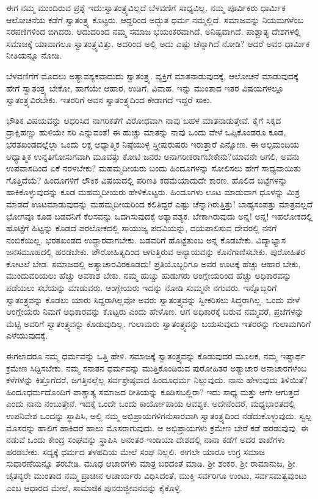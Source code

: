 ಈಗ ನಮ್ಮ ಮುಂದಿರುವ ಪ್ರಶ್ನೆ ಇದು:ಸ್ವಾತಂತ್ರ್ಯವಿಲ್ಲದೆ ಬೆಳವಣಿಗೆ ಸಾಧ್ಯವಿಲ್ಲ. ನಮ್ಮ ಪೂರ್ವಿಕರು ಧಾರ್ಮಿಕ ಆಲೋಚನೆಯ ಕಡೆಗೆ ಸ್ವಾತಂತ್ರ್ಯ ಕೊಟ್ಟರು. ಆದ್ದರಿಂದ ಅದ್ಭುತ ಧರ್ಮ ನಮ್ಮಲ್ಲಿದೆ. ಸಮಾಜವನ್ನು ನಿಯಮಗಳೆಂಬ ಸರಪಣಿಗಳಿಂದ ಬಿಗಿದರು. ಆದುದರಿಂದ ನಮ್ಮ ಸಮಾಜ ಭಯಂಕರವಾಗಿದೆ, ಅನಿಷ್ಟವಾಗಿದೆ. ಪಾಶ್ಚಾತ್ಯ ದೇಶಗಳಲ್ಲಿ ಸಮಾಜಕ್ಕೆ ಯಾವಾಗಲೂ ಸ್ವಾತಂತ್ರ್ಯವಿತ್ತು. ಅದರಿಂದ ಅಲ್ಲಿ ಅದು ಎಷ್ಟು ಚೆನ್ನಾಗಿದೆ ನೋಡಿ? ಆದರೆ ಅವರ ಧಾರ್ಮಿಕ ನೀತಿಯನ್ನೂ ನೋಡಿ.

ಬೆಳವಣಿಗೆಗೆ ಮೊದಲು ಅತ್ಯಾವಶ್ಯಕವಾದುದು ಸ್ವಾತಂತ್ರ್ಯ. ವ್ಯಕ್ತಿಗೆ ಮಾತನಾಡುವುದಕ್ಕೆ, ಆಲೋಚನೆ ಮಾಡುವುದಕ್ಕೆ ಹೇಗೆ ಸ್ವಾತಂತ್ರ್ಯ ಬೇಕೋ, ಹಾಗೆಯೇ ಆಹಾರ, ಉಡಿಗೆ, ವಿವಾಹ, ಇನ್ನು ಮುಂತಾದ ಇತರ ವಿಷಯಗಳಲ್ಲೂ ಸ್ವಾತಂತ್ರ್ಯವಿರಬೇಕು. ಇತರರಿಗೆ ಅವನ ಸ್ವಾತಂತ್ರ್ಯದಿಂದ ಕೇಡಾಗದೆ ಇದ್ದರೆ ಸಾಕು.

ಭೌತಿಕ ವಿಷಯವನ್ನು ಆಧರಿಸಿದ ನಾಗರಿಕತೆಗೆ ವಿರೋಧವಾಗಿ ನಾವು ಬಹಳ ಮಾತನಾಡುತ್ತೇವೆ. ಕೈಗೆ ಸಿಕ್ಕದ ದ್ರಾಕ್ಷಿಹಣ್ಣು ಹುಳಿಯೇ ಸರಿ ಎನ್ನುವಂತೆ! ಈ ಹುಚ್ಚು ಮಾತನ್ನು ನಾವು ಒಂದು ವೇಳೆ ಒಪ್ಪಿಕೊಂಡರೂ ಕೂಡ, ಭರತಖಂಡದಲ್ಲೆಲ್ಲಾ ಒಂದು ಲಕ್ಷ ಆಧ್ಯಾತ್ಮಿಕ ನಿಷ್ಠೆಯುಳ್ಳ ಸ್ತ್ರೀ\enginline{-}ಪುರುಷರು ಇರುತ್ತಾರೆ ಎನ್ನೋಣ. ಈ ಅಲ್ಪಮಂದಿಯ ಆಧ್ಯಾತ್ಮಿಕ ಉನ್ನತಿಗೋಸುಗವಾಗಿ ಮೂವತ್ತು ಕೋಟಿ ಜನರು ಅನಾಗರೀಕರಾಗಬೇಕೇನು?ಯಾವನೇ ಆಗಲಿ, ಅವನು ಉಪವಾಸದಿಂದ ಏಕೆ ನರಳಬೇಕು? ಮಹಮ್ಮದೀಯರು ಬಂದು ಹಿಂದೂಗಳನ್ನು ಸೋಲಿಸಲು ಹೇಗೆ ಸಾಧ್ಯವಾಯಿತು ಗೊತ್ತಿದೆಯೆ? ಹಿಂದೂಗಳಿಗೆ ಲೌಕಿಕ ವಿಷಯದಲ್ಲಿ ಪರಿಣತಿ ಕಡಮೆಯಾದುದೇ ಕಾರಣ. ಹೊಲಿದ ಬಟ್ಟೆಗಳನ್ನು ಹಾಕಿಕೊಳ್ಳುವುದನ್ನು ಕೂಡ ಮಹಮ್ಮದೀಯರು ಹೇಳಿಕೊಟ್ಟರು. ಹಿಂದೂಗಳು ಊಟ ಮಾಡುವಾಗ ಧೂಳನ್ನು ಮಿಶ್ರ ಮಾಡದೆ ಊಟಮಾಡುವುದನ್ನು ಮಹಮ್ಮದೀಯರಿಂದ ಕಲಿತಿದ್ದರೆ ಎಷ್ಟು ಚೆನ್ನಾಗಿರುತ್ತಿತ್ತು! ಬಾಹ್ಯಸಂಪತ್ತು ಮಾತ್ರವಲ್ಲದೆ ಭೋಗವೂ ಕೂಡ ಬಡವನಿಗೆ ಕೆಲಸವನ್ನು ಒದಗಿಸುವುದಕ್ಕೆ ಅತ್ಯಾವಶ್ಯಕ. ಬೇಕಾಗಿರುವುದು ಅನ್ನ! ಅನ್ನ! ಇಹಲೋಕದಲ್ಲಿ ಹೊಟ್ಟೆಗೆ ಹಿಟ್ಟನ್ನು ಕೊಡದೆ ಪರಲೋಕದಲ್ಲಿ ಸಾಯುಜ್ಯ ಪದವಿಯನ್ನು, ದಯಪಾಲಿಸುವ ದೇವರಲ್ಲಿ ನನಗೆ ನಂಬಿಕೆಯಿಲ್ಲ. ಭರತಖಂಡದ ಉದ್ದಾರವಾಗಬೇಕು. ಬಡವರಿಗೆ ಹೊಟ್ಟೆತುಂಬ ಅನ್ನ ಕೊಡಬೇಕು. ವಿದ್ಯಾಭ್ಯಾಸ ಜನಸಮೂಹದಲ್ಲಿ ಹರಡಬೇಕು. ಪೌರೋಹಿತ್ಯದಿಂದ ಆಗುತ್ತಿರುವ ಅನ್ಯಾಯವನ್ನು ಕೊನೆಗಾಣಿಸಬೇಕು. ಪುರೋಹಿತರ ಕೋಟಲೆ ಬೇಡ. ಸಮಾಜದಲ್ಲಿ ಅತ್ಯಾಚಾರವಿರಕೂಡದು! ಪ್ರತಿಯೊಬ್ಬರಿಗೂ ಅವರ ಊಟಕ್ಕೆ ಹೆಚ್ಚು ಆಹಾರ ಬೇಕು, ಮುಂದುವರಿಯಲು ಹೆಚ್ಚು ಅವಕಾಶ ಬೇಕು. ನಮ್ಮ ಹುಚ್ಚು ಹುಡುಗರು ಆಂಗ್ಲೇಯರಿಂದ ಹೆಚ್ಚು ಅಧಿಕಾರವನ್ನು ಪಡೆಯಲು ಸಭೆಯನ್ನು ಮಾಡುವರು. ಆಂಗ್ಲೇಯರು ಇದನ್ನು ನೋಡಿ ಸುಮ್ಮನೇ ನಗುವರು. ಇನ್ನೊಬ್ಬರಿಗೆ ಸ್ವಾತಂತ್ರ್ಯವನ್ನು ಕೊಡಲು ಯಾರು ಸಿದ್ದರಾಗಿಲ್ಲವೋ ಅವರು ಸ್ವಾತಂತ್ರ್ಯವನ್ನು ಸ್ವೀಕರಿಸಲು ಸಿದ್ಧರಾಗಿಲ್ಲ. ಒಂದು ವೇಳೆ ಆಂಗ್ಲೇಯರು ನಿಮಗೆ ಅಧಿಕಾರವನ್ನು ಕೊಟ್ಟರು ಎಂದು ಹೇಳೊಣ. ಆಗ ಅಧಿಕಾರಕ್ಕೆ ಬರುವ ನಮ್ಮವರೆ, ಪ್ರಜೆಗಳನ್ನು ಮೆಟ್ಟಿ ಅವರಿಗೆ ಸ್ವಾತಂತ್ರ್ಯವನ್ನು ಕೊಡುವುದಿಲ್ಲ. ಗುಲಾಮರು ಸ್ವಾತಂತ್ರ್ಯವನ್ನು ಬಯಸುವುದು ಇತರರನ್ನು ಗುಲಾಮಗಿರಿಗೆ ಎಳೆಯುವುದಕ್ಕೆ.

ಈಗಲಾದರೂ ನಮ್ಮ ಧರ್ಮವನ್ನು ಒತ್ತಿ ಹೇಳಿ. ಸಮಾಜಕ್ಕೆ ಸ್ವಾತಂತ್ರ್ಯವನ್ನು ಕೊಡುವುದರ ಮೂಲಕ, ನಮ್ಮ ಇಷ್ಟಾರ್ಥ ಕ್ರಮೇಣ ಸಿದ್ದಿಸಬೇಕು. ನಮ್ಮ ಸನಾತನ ಧರ್ಮವನ್ನು ಮುತ್ತಿಕೊಂಡಿರುವ ಪುರೋಹಿತರ ಅತ್ಯಾಚಾರ ಅನಾಚಾರಗಳೆಂಬ ಕಳೆಗಳನ್ನು ಕಿತ್ತೊಗೆದರೆ, ಜಗತ್ತಿನಲ್ಲೆಲ್ಲ ಸರ್ವಶ್ರೇಷ್ಠವಾದ ಹಿಂದೂಧರ್ಮ ನಿಲ್ಲುವುದು. ನಾನು ಹೇಳುವುದು ತಿಳಿಯಿತೆ? ಹಿಂದೂಧರ್ಮದೊಂದಿಗೆ ಪಾಶ್ಚಾತ್ಯ ಸಮಾಜದ ರೀತಿಯನ್ನು ಕೂಡಿಸಬಲ್ಲಿರಾ? ಇದು ಸಾಧ್ಯ ಮತ್ತು ಆಗೇ ಆಗುತ್ತದೆ ಎಂದು ನಾನು ನಂಬುತ್ತೇನೆ. ಇದಕ್ಕೆ ಒಂದೇ ಒಂದು ಕಾರ್ಯೋಪಾಯ ಆವಶ್ಯಕ. ಅದೇನೆಂದರೆ, ಮಧ್ಯಭಾರತದಲ್ಲಿ ಉಪನಿವೇಶ ಒಂದನ್ನು ಸ್ಥಾಪಿಸಿ, ಅಲ್ಲಿ ನಮ್ಮ ಅಭಿಪ್ರಾಯಗಳಿಗನುಸಾರವಾಗಿ ಸ್ವಾತಂತ್ರ್ಯದಿಂದ ನಡೆದುಕೊಳ್ಳುವುದು. ಸ್ವಲ್ಪ ಮೊಸರನ್ನು ಹಾಲಿಗೆ ಹಾಕಿದರೆ ಹಾಲು ಮೊಸರಾಗುವುದು. ಆ ಅಭಿಪ್ರಾಯಗಳು ಕ್ರಮೇಣ ಬೇರೆ ಕಡೆ ಹರಡುವುವು. ಈ ನಡುವೆ ಒಂದು ಕೇಂದ್ರ ಸಂಘವನ್ನು ಸ್ಥಾಪಿಸಿ ಅನಂತರ ಇಂಡಿಯಾ ದೇಶದಲ್ಲಿ ನಾನಾ ಕಡೆಗೆ ಅದರ ಶಾಖೆಗಳು ಹರಡಬೇಕು. ಸದ್ಯಕ್ಕೆ ಧರ್ಮದ ತಳಹದಿಯ ಮೇಲೆ ಸಂಘ ನಿಲ್ಲಲಿ. ಈಗಲೇ ಯಾರೂ ಉಗ್ರ ಸಮಾಜ ಸುಧಾರಣೆಯನ್ನೂ ತರಬೇಡಿ. ಮೂಢ ಆಚಾರಗಳು ಮಾತ್ರ ಬರದಂತೆ ಮಾಡಿ. ಶ‍್ರೀ ಶಂಕರ, ಶ‍್ರೀ ರಾಮಾನುಜ, ಶ‍್ರೀ ಚೈತನ್ಯರೇ ಮುಂತಾದ ನಮ್ಮ ಪ್ರಾಚೀನ ಆಚಾರ್ಯರು ವಿಧಿಸಿದಂತೆ, ಮುಕ್ತಿ ಸರ್ವರಿಗೂ ಉಂಟು, ಸರ್ವಸಮತ್ವವುಂಟು ಎಂಬ ಆಧಾರದ ಮೇಲೆ, ಸಾಮಾಜಿಕ ಪುನರುಜ್ಜೀವನವನ್ನು ಕೈಕೊಳ್ಳಿ.

